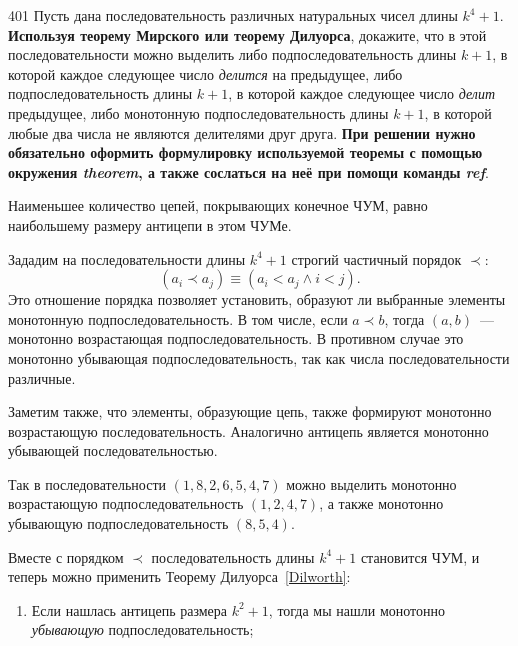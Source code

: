 \begin{task}{401}
Пусть дана последовательность различных натуральных чисел длины \(k^4+1\). \textbf{Используя теорему Мирского или теорему Дилуорса}, докажите, что в этой последовательности можно выделить либо подпоследовательность длины \(k+1\), в которой каждое следующее число \emph{делится} на предыдущее, либо подпоследовательность длины \(k+1\), в которой каждое следующее число \emph{делит} предыдущее, либо монотонную подпоследовательность длины \(k+1\), в которой любые два числа не являются делителями друг друга. \textbf{При решении нужно обязательно оформить формулировку используемой теоремы с помощью окружения \emph{theorem}, а также сослаться на неё при помощи команды \emph{ref}}.
\end{task}

\begin{solution}

\begin{theorem}  \label{Dilworth}
    Наименьшее количество цепей, покрывающих конечное ЧУМ, равно наибольшему размеру антицепи в этом ЧУМе.
\end{theorem}

Зададим на последовательности длины \(k^4+1\) строгий частичный порядок \(\prec\):
\begin{equation*}
    \left( a_i \prec a_j \right) \equiv \left( a_i < a_j \land i < j \right).
\end{equation*}
Это отношение порядка позволяет установить, образуют ли выбранные элементы монотонную подпоследовательность. В том числе, если \(a \prec b\), тогда \(\left( a, b \right)\)~--- монотонно возрастающая подпоследовательность. В противном случае это монотонно убывающая подпоследовательность, так как числа последовательности различные.

Заметим также, что элементы, образующие цепь, также формируют монотонно возрастающую последовательность. Аналогично антицепь является монотонно убывающей последовательностью.

Так в последовательности \(\left( 1, 8, 2, 6, 5, 4, 7 \right)\) можно выделить монотонно возрастающую подпоследовательность \(\left( 1, 2, 4, 7 \right)\), а также монотонно убывающую подпоследовательность \(\left( 8, 5, 4 \right)\).

Вместе с порядком \(\prec\) последовательность длины \(k^4+1\) становится ЧУМ, и теперь можно применить Теорему Дилуорса~\ref{Dilworth}:
\begin{enumerate}
    \item Если нашлась антицепь размера \(k^2+1\), тогда мы нашли монотонно \emph{убывающую} подпоследовательность;
    

\end{enumerate}
\end{solution}
